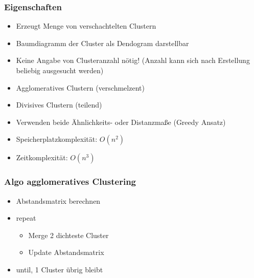 \documentclass[a4paper]{article}
\begin{document}
\begin{landscape}
\begin{multicols}{3}
    \subsubsection{Eigenschaften}
    \begin{itemize}[noitemsep,nolistsep]
        \item Erzeugt Menge von verschachtelten Clustern
        \item Baumdiagramm der Cluster als Dendogram darstellbar
        \item Keine Angabe von Clusteranzahl nötig! (Anzahl kann sich nach Erstellung beliebig ausgesucht werden)
        \item Agglomeratives Clustern (verschmelzent)
        \item Divisives Clustern (teilend)
        \item Verwenden beide Ähnlichkeits- oder Distanzmaße (Greedy Ansatz)
        \item Speicherplatzkomplexität: $O(n^2)$
        \item Zeitkomplexität: $O(n^3)$
    \end{itemize}

    \subsubsection{Algo agglomeratives Clustering}
    \begin{itemize}[noitemsep,nolistsep]
        \item Abstandsmatrix berechnen 
        \item repeat
        \begin{itemize}[noitemsep,nolistsep]
            \item Merge 2 dichteste Cluster 
            \item Update Abstandsmatrix
        \end{itemize}
        \item until, 1 Cluster übrig bleibt
    \end{itemize}


\end{multicols}
\end{landscape}
\end{document}
